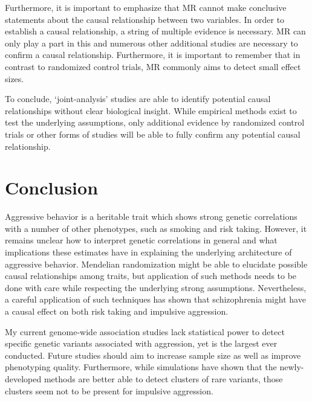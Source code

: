 Furthermore, it is important to emphasize that MR cannot make conclusive statements about the causal relationship between two variables.
In order to establish a causal relationship, a string of multiple evidence is necessary.
MR can only play a part in this and numerous other additional studies are necessary to confirm a causal relationship.
Furthermore, it is important to remember that in contrast to randomized control trials, MR commonly aims to detect small effect sizes.

To conclude, `joint-analysis' studies are able to identify potential causal relationships without clear biological insight.
While empirical methods exist to test the underlying assumptions, only additional evidence by randomized control trials or other forms of studies will be able to fully confirm any potential causal relationship.

\section{Conclusion}
\label{sec:conclusion}

Aggressive behavior is a heritable trait which shows strong genetic correlations with a number of other phenotypes, such as smoking and risk taking.
However, it remains unclear  how to interpret genetic correlations in general and what implications these estimates have in explaining the underlying architecture of aggressive behavior.
Mendelian randomization might be able to elucidate possible causal relationships among traits, but application of such methods needs to be done with care while respecting the underlying strong assumptions. 
Nevertheless, a careful application of such techniques has shown that schizophrenia might have a causal effect on both risk taking and impulsive aggression.

My current genome-wide association studies lack statistical power to detect specific genetic variants associated with aggression, yet is the largest ever conducted.
Future studies should aim to increase sample size as well as improve phenotyping quality.
Furthermore, while simulations have shown that the newly-developed methods are better able to detect clusters of rare variants, those clusters seem not to be present for impulsive aggression.
